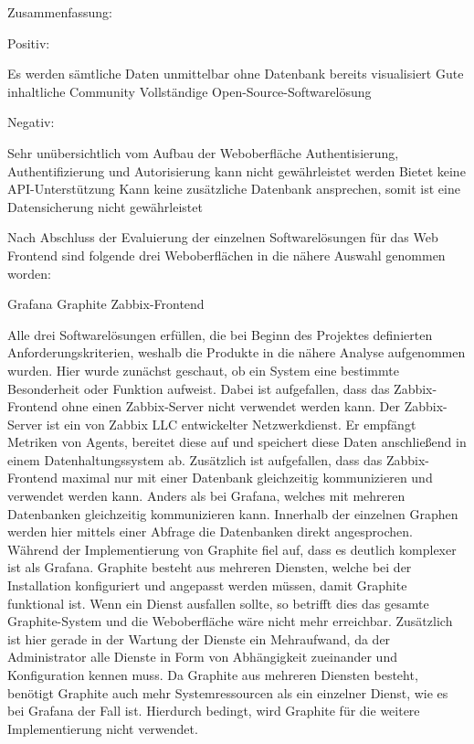 Zusammenfassung:

Positiv:

\begin{outline}
  \1 Es werden sämtliche Daten unmittelbar ohne Datenbank bereits visualisiert
  \1 Gute inhaltliche Community
  \1 Vollständige Open-Source-Softwarelösung
\end{outline}

Negativ:

\begin{outline}
  \1 Sehr unübersichtlich vom Aufbau der Weboberfläche
  \1 Authentisierung, Authentifizierung und Autorisierung kann nicht
  gewährleistet werden
  \1 Bietet keine API-Unterstützung
  \1 Kann keine zusätzliche Datenbank ansprechen, somit ist eine Datensicherung
  nicht gewährleistet
\end{outline}

Nach Abschluss der Evaluierung der einzelnen Softwarelösungen für das Web
Frontend sind folgende drei Weboberflächen in die nähere Auswahl genommen
worden:

\begin{outline}
  \1 Grafana
  \1 Graphite
  \1 Zabbix-Frontend
\end{outline}

Alle drei Softwarelösungen erfüllen, die bei Beginn des Projektes definierten
Anforderungskriterien, weshalb die Produkte in die nähere Analyse aufgenommen
wurden. Hier wurde zunächst geschaut, ob ein System eine bestimmte Besonderheit
oder Funktion aufweist. Dabei ist aufgefallen, dass das Zabbix-Frontend ohne
einen Zabbix-Server nicht verwendet werden kann. Der Zabbix-Server ist ein von
Zabbix LLC entwickelter Netzwerkdienst. Er empfängt Metriken von Agents,
bereitet diese auf und speichert diese Daten anschließend in einem
Datenhaltungssystem ab. Zusätzlich ist aufgefallen, dass das Zabbix-Frontend
maximal nur mit einer Datenbank gleichzeitig kommunizieren und verwendet werden
kann. Anders als bei Grafana, welches mit mehreren Datenbanken gleichzeitig
kommunizieren kann. Innerhalb der einzelnen Graphen werden hier mittels einer
Abfrage die Datenbanken direkt angesprochen. Während der Implementierung von
Graphite fiel auf, dass es deutlich komplexer ist als Grafana. Graphite besteht
aus mehreren Diensten, welche bei der Installation konfiguriert und
angepasst werden müssen, damit Graphite funktional ist. Wenn ein Dienst
ausfallen sollte, so betrifft dies das gesamte Graphite-System und die
Weboberfläche wäre nicht mehr erreichbar. Zusätzlich ist hier gerade in der
Wartung der Dienste ein Mehraufwand, da der Administrator alle Dienste in Form
von Abhängigkeit zueinander und Konfiguration kennen muss. Da Graphite aus
mehreren Diensten besteht, benötigt Graphite auch mehr Systemressourcen als ein
einzelner Dienst, wie es bei Grafana der Fall ist. Hierdurch bedingt, wird
Graphite für die weitere Implementierung nicht verwendet.
\mr%

